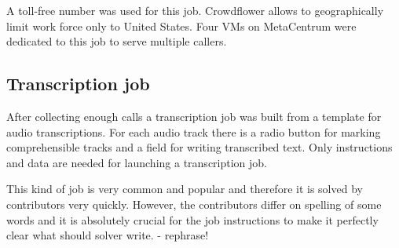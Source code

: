 
\begin{table}[h]
\centering
\hspace*{-3pt}
\end{table}


A toll-free number was used for this job.
Crowdflower allows to geographically limit work force only to United States.
Four VMs on MetaCentrum were dedicated to this job to serve multiple callers. %


\subsection{Transcription job}

After collecting enough calls a transcription job was built from a template for audio transcriptions.
For each audio track there is a radio button for marking comprehensible tracks and a field for writing transcribed text.
Only instructions and data are needed for launching a transcription job.

This kind of job is very common and popular and therefore it is solved by contributors very quickly.
However, the contributors differ on spelling of some words and it is absolutely crucial for the job instructions to make it perfectly clear what should solver write. - rephrase!

